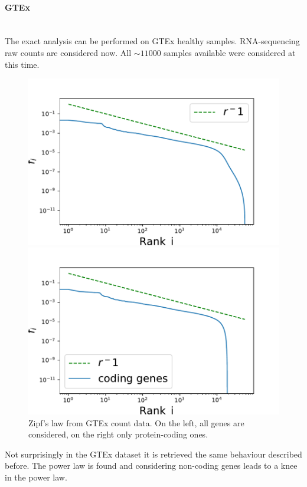 \paragraph{GTEx}\mbox{} \\
The exact analysis can be performed on GTEx healthy samples. RNA-sequencing raw counts are considered now. All $\sim11000$ samples available were considered at this time.
\begin{figure}[htb!]
    \centering
    \begin{minipage}{0.45\textwidth}
    \includegraphics[width=0.95\linewidth]{pictures/structure/gtex/globalZipf.pdf}
    \end{minipage}
    \hspace{2mm}
    \begin{minipage}{0.45\textwidth}
    \includegraphics[width=0.95\linewidth]{pictures/structure/gtex/globalZipf_c.pdf}
    \end{minipage}
    \caption{Zipf's law from GTEx count data. On the left, all genes are considered, on the right only protein-coding ones.}
    \label{fig:my_label}
\end{figure}
Not surprisingly in the GTEx dataset it is retrieved the same behaviour described before. The power law is found and considering non-coding genes leads to a knee in the power law.

